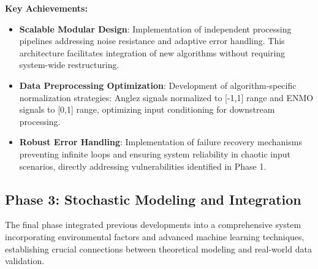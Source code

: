 \documentclass[conference]{IEEEtran}
\begin{document}
\textbf{Key Achievements:}
\begin{itemize}
    \item \textbf{Scalable Modular Design}: Implementation of independent processing pipelines addressing noise resistance and adaptive error handling. This architecture facilitates integration of new algorithms without requiring system-wide restructuring.
    
    \item \textbf{Data Preprocessing Optimization}: Development of algorithm-specific normalization strategies: Anglez signals normalized to [-1,1] range and ENMO signals to [0,1] range, optimizing input conditioning for downstream processing.
    
    \item \textbf{Robust Error Handling}: Implementation of failure recovery mechanisms preventing infinite loops and ensuring system reliability in chaotic input scenarios, directly addressing vulnerabilities identified in Phase 1.
\end{itemize}

\subsection{Phase 3: Stochastic Modeling and Integration}
The final phase integrated previous developments into a comprehensive system incorporating environmental factors and advanced machine learning techniques, establishing crucial connections between theoretical modeling and real-world data validation.
\end{document}
